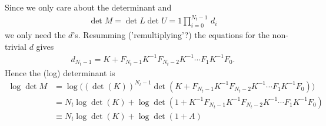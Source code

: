 \documentclass[a4paper, fleqn, twoside, notitlepage]{scrartcl}
\begin{document}
Since we only care about the determinant and
\begin{align}
  \det M = \det L \det U = 1 \prod_{i=0}^{N_t-1}\,d_i
\end{align}
we only need the $d$'s.
Resumming ('remultiplying'?) the equations for the non-trivial $d$ gives
\begin{align}
  d_{N_t-1} = K + F_{N_t-1}K^{-1} F_{N_t-2}K^{-1} \cdots F_{1}K^{-1} F_{0}.
\end{align}
Hence the (log) determinant is
\begin{align}
  \log \det M &= \log \big({(\det(K))}^{N_t-1} \det (K + F_{N_t-1}K^{-1} F_{N_t-2}K^{-1} \cdots F_{1}K^{-1} F_{0})\big)\\
              &= N_t \log \det(K)  + \log \det (1 + K^{-1}F_{N_t-1}K^{-1} F_{N_t-2}K^{-1} \cdots F_{1}K^{-1} F_{0})\\
              &\equiv N_t \log \det(K)  + \log \det (1 + A)\label{eq:def_A}
\end{align}
\end{document}
